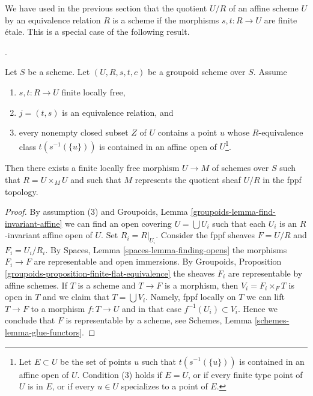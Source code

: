 \noindent
We have used in the previous section that the quotient $U/R$ of an
affine scheme $U$ by an equivalence relation $R$ is a scheme if the
morphisms $s, t : R \to U$ are finite \'etale. This is a special case
of the following result.

\begin{proposition}
\label{proposition-finite-flat-equivalence-global}
\begin{reference}
\cite[Expos\'e 212, Th\'eor\`eme 5.3, Corollaire 5.4, and Scholium,
pp. 111--112]{FGA}.
\end{reference}
Let $S$ be a scheme.
Let $(U, R, s, t, c)$ be a groupoid scheme over $S$.
Assume
\begin{enumerate}
\item $s, t : R \to U$ finite locally free,
\item $j = (t, s)$ is an equivalence relation, and
\item every nonempty closed subset $Z$ of $U$ contains a point
$u$ whose $R$-equivalence class $t(s^{-1}(\{u\}))$ is contained
in an affine open of $U$\footnote{Let $E \subset U$ be the
set of points $u$ such that $t(s^{-1}(\{u\}))$
is contained in an affine open of $U$. Condition (3) holds
if $E = U$, or if every finite type point of $U$ is in $E$, or
if every $u \in U$ specializes to a point of $E$.}.
\end{enumerate}
Then there exists a finite locally free morphism $U \to M$
of schemes over $S$ such that $R = U \times_M U$ and such that $M$
represents the quotient sheaf $U/R$ in the fppf topology.
\end{proposition}

\begin{proof}
By assumption (3) and
Groupoids, Lemma \ref{groupoids-lemma-find-invariant-affine}
we can find an open covering $U = \bigcup U_i$ such that each $U_i$
is an $R$-invariant affine open of $U$. Set $R_i = R|_{U_i}$.
Consider the fppf sheaves $F = U/R$ and $F_i = U_i/R_i$.
By Spaces, Lemma \ref{spaces-lemma-finding-opens} the morphisms
$F_i \to F$ are representable and open immersions.
By Groupoids, Proposition \ref{groupoids-proposition-finite-flat-equivalence}
the sheaves $F_i$ are representable by affine schemes.
If $T$ is a scheme and $T \to F$ is a morphism, then $V_i = F_i \times_F T$
is open in $T$ and we claim that $T = \bigcup V_i$. Namely,
fppf locally on $T$ we can lift $T \to F$ to a morphism
$f : T \to U$ and in that case $f^{-1}(U_i) \subset V_i$.
Hence we conclude that $F$ is representable by a scheme, see
Schemes, Lemma \ref{schemes-lemma-glue-functors}.
\end{proof}

